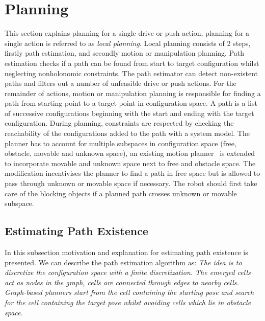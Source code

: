 \section{Planning}%
\label{sec:planning}
This section explains planning for a single drive or push action, planning for a single action is referred to as \textit{local planning}. Local planning consists of 2 steps, firstly path estimation, and secondly motion or manipulation planning. Path estimation checks if a path can be found from start to target configuration whilst neglecting nonholonomic constraints. The path estimator can detect non-existent paths and filters out a number of unfeasible drive or push actions. For the remainder of actions, motion or manipulation planning is responsible for finding a path from starting point to a target point in configuration space. A path is a list of successive configurations beginning with the start and ending with the target configuration. During planning, constraints are respected by checking the reachability of the configurations added to the path with a system model. The planner has to account for multiple subspaces in configuration space (free, obstacle, movable and unknown space), an existing motion planner~\cite{chen_fast_2018} is extended to incorporate movable and unknown space next to free and obstacle space. The modification incentivises the planner to find a path in free space but is allowed to pass through unknown or movable space if necessary. The robot should first take care of the blocking objects if a planned path crosses unknown or movable subspace.\bs

\subsection{Estimating Path Existence}%
\label{subsec:path_estimation}
In this subsection motivation and explanation for estimating path existence is presented. We can describe the path estimation algorithm as: \textit{The idea is to discretize the configuration space with a finite discretization. The emerged cells act as nodes in the graph, cells are connected through edges to nearby cells. Graph-based planners start from the cell containing the starting pose and search for the cell containing the target pose whilst avoiding cells which lie in obstacle space.\bs}


